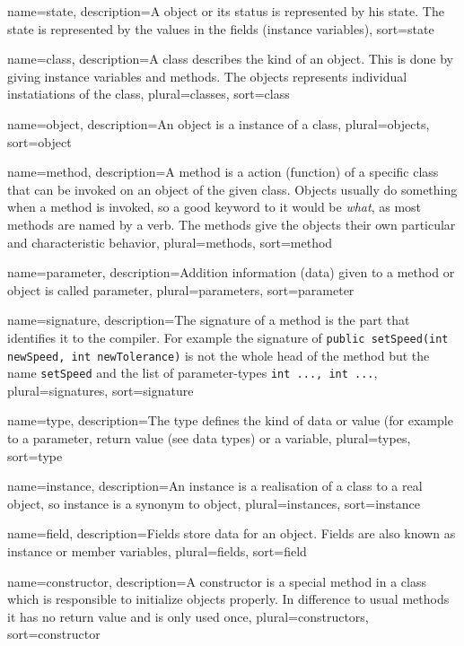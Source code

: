 {
	name=state,
	description={A object or its status is represented by his state.
		The state is represented by the values in the fields
		(instance variables)},
	sort=state
}


{
	name=class,
	description={A class describes the kind of an object. This is done
		by giving instance variables and methods. The objects 
		represents individual instatiations of the class},
	plural=classes,
	sort=class
}

{
	name=object,
	description={An object is a instance of a class},
	plural=objects,
	sort=object
}

{
	name=method,
	description={A method is a action (function) of a specific class that
		can be invoked on an object of the given class. Objects usually
		do something when a method is invoked, so a good keyword to it
		would be \textit{what}, as most methods are named by a verb.
		The methods give the objects their own particular and
		characteristic behavior},
	plural=methods,
	sort=method
}

{
	name=parameter,
	description={Addition information (data) given to a method or object
		is called parameter},
	plural=parameters,
	sort=parameter
}

{
	name=signature,
	description={The signature of a method is the part that identifies 
		it to the compiler. For example the signature of 
		\lstinline{public setSpeed(int newSpeed, int newTolerance)}
		is not the whole head of the method but the name 
		\lstinline{setSpeed} and the list of parameter-types 
		\lstinline{int ..., int ...}},
	plural=signatures,
	sort=signature
}

{
	name=type,
	description={The type defines the kind of data or value (for example 
		to a parameter, return value (see data types) or a variable},
	plural=types,
	sort=type
}

{
	name=instance,
	description={An instance is a realisation of a class to a real object,
		so instance is a synonym to object},
	plural=instances,
	sort=instance
}

{
	name=field,
	description={Fields store data for an object. Fields are also
		known as instance or member variables},
	plural=fields,
	sort=field
}

{
	name=constructor,
	description={A constructor is a special method in a class which is
		responsible to initialize objects properly. In difference to
		usual methods it has no return value and is only used once},
	plural=constructors,
	sort=constructor
}

